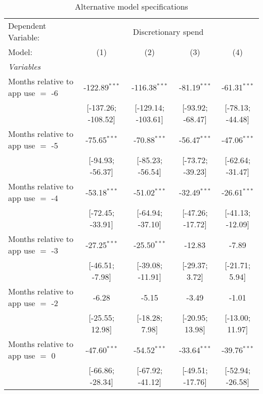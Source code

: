 
\begin{table}[htbp]
   \centering
   \tiny
   \begin{threeparttable}[b]
      \caption{\label{tab:dspend_alt} Alternative model specifications}
      \begin{tabular}{lcccc}
         \tabularnewline \midrule \midrule
         Dependent Variable: & \multicolumn{4}{c}{Discretionary spend}\\
         Model:                            & (1)                & (2)                & (3)              & (4)\\  
         \midrule
         \emph{Variables}\\
         Months relative to app use $=$ -6 & -122.89$^{***}$    & -116.38$^{***}$    & -81.19$^{***}$   & -61.31$^{***}$\\   
                                           & [-137.26; -108.52] & [-129.14; -103.61] & [-93.92; -68.47] & [-78.13; -44.48]\\   
         Months relative to app use $=$ -5 & -75.65$^{***}$     & -70.88$^{***}$     & -56.47$^{***}$   & -47.06$^{***}$\\   
                                           & [-94.93; -56.37]   & [-85.23; -56.54]   & [-73.72; -39.23] & [-62.64; -31.47]\\   
         Months relative to app use $=$ -4 & -53.18$^{***}$     & -51.02$^{***}$     & -32.49$^{***}$   & -26.61$^{***}$\\   
                                           & [-72.45; -33.91]   & [-64.94; -37.10]   & [-47.26; -17.72] & [-41.13; -12.09]\\   
         Months relative to app use $=$ -3 & -27.25$^{***}$     & -25.50$^{***}$     & -12.83           & -7.89\\   
                                           & [-46.51; -7.98]    & [-39.08; -11.91]   & [-29.37; 3.72]   & [-21.71; 5.94]\\   
         Months relative to app use $=$ -2 & -6.28              & -5.15              & -3.49            & -1.01\\   
                                           & [-25.55; 12.98]    & [-18.28; 7.98]     & [-20.95; 13.98]  & [-13.00; 11.97]\\   
         Months relative to app use $=$ 0  & -47.60$^{***}$     & -54.52$^{***}$     & -33.64$^{***}$   & -39.76$^{***}$\\   
                                           & [-66.86; -28.34]   & [-67.92; -41.12]   & [-49.51; -17.76] & [-52.94; -26.58]\\   

\end{tabular}
\end{threeparttable}
\end{table}
